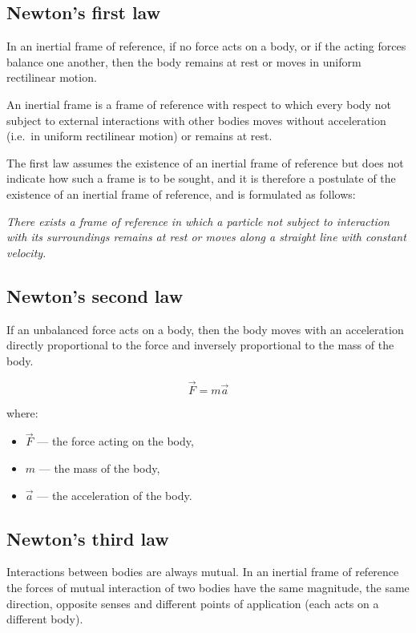 \subsection{Newton's first law}

In an inertial frame of reference, if no force acts on a body, or if the acting forces balance one another, then the body remains at rest or moves in uniform rectilinear motion.

An inertial frame is a frame of reference with respect to which every body not subject to external interactions with other bodies moves without acceleration (i.e.\ in uniform rectilinear motion) or remains at rest.

The first law assumes the existence of an inertial frame of reference but does not indicate how such a frame is to be sought, and it is therefore a postulate of the existence of an inertial frame of reference, and is formulated as follows:

\textit{There exists a frame of reference in which a particle not subject to interaction with its surroundings remains at rest or moves along a straight line with constant velocity.}

\subsection{Newton's second law}

If an unbalanced force acts on a body, then the body moves with an acceleration directly proportional to the force and inversely proportional to the mass of the body.

\[
\vec{F} = m \vec{a}
\]

where:
\begin{itemize}
    \item \(\vec{F}\) --- the force acting on the body,
    \item \(m\) --- the mass of the body,
    \item \(\vec{a}\) --- the acceleration of the body.
\end{itemize}

\subsection{Newton's third law}

Interactions between bodies are always mutual. In an inertial frame of reference the forces of mutual interaction of two bodies have the same magnitude, the same direction, opposite senses and different points of application (each acts on a different body).

